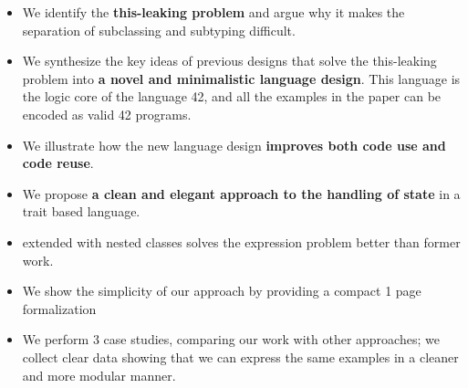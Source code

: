 




\begin{itemize}
\item We identify the {\bf this-leaking problem} and argue why it
  makes the separation of subclassing and subtyping difficult.
\item We synthesize the key ideas of previous designs that solve the
  this-leaking problem into {\bf a novel and
  minimalistic language design}. This language is the logic core of the language 42, and 
  all the examples in the paper can be encoded as valid 42 programs. 

\item We illustrate how the new language design {\bf improves both code use and code
  reuse}.
\item We propose {\bf a clean and elegant approach to the handling of state} in a trait based language.

\item \name extended with nested classes solves the expression problem better than former work.
\item We show the simplicity of our approach by providing a compact 1 page formalization
\item We perform 3 case studies, comparing our work with other approaches; we collect clear data showing that we can express the same examples in a cleaner and more modular manner.
\end{itemize}
\saveSpace
\saveSpace

